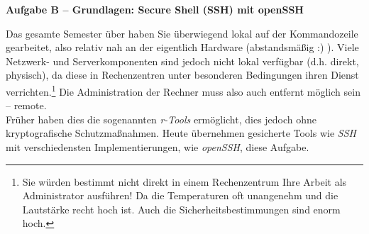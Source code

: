 \documentclass[paper=a4,fontsize=11pt]{scrartcl}%
\begin{document}
\begin{center}\Large{\textbf{Aufgabe B -- Grundlagen: Secure Shell (SSH) mit openSSH}}\end{center}\vskip0.25in
Das gesamte Semester über haben Sie überwiegend lokal auf der Kommandozeile gearbeitet, also relativ nah an der eigentlich Hardware (abstandsmäßig :) ). Viele Netzwerk- und Serverkomponenten sind jedoch nicht lokal verfügbar (d.h. direkt, physisch), da diese in Rechenzentren unter besonderen Bedingungen ihren Dienst verrichten.\footnote{Sie würden bestimmt nicht direkt in einem Rechenzentrum Ihre Arbeit als Administrator ausführen! Da die Temperaturen oft unangenehm und die Lautstärke recht hoch ist. Auch die Sicherheitsbestimmungen sind enorm hoch.} Die Administration der Rechner muss also auch entfernt möglich sein -- remote.\\
Früher haben dies die sogenannten \emph{r-Tools} ermöglicht, dies jedoch ohne kryptografische Schutzmaßnahmen. Heute übernehmen gesicherte Tools wie \emph{SSH} mit verschiedensten Implementierungen, wie \emph{openSSH}, diese Aufgabe.
\end{document}
